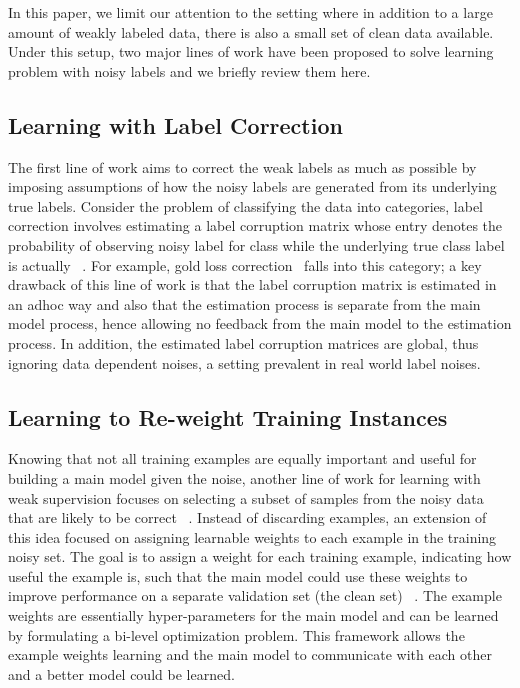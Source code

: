 In this paper, we limit our attention to the setting where in addition
to a large amount of weakly labeled data, there is also a small set of
clean data available.  Under this setup, two major lines of work have
been proposed to solve learning problem with noisy labels and we
briefly review them here.

\subsection{Learning with Label Correction}

The first line of work aims to correct the weak labels as much as
possible by imposing assumptions of how the noisy labels are generated
from its underlying true labels. Consider the problem of classifying
the data into  categories, label correction involves estimating a
label corruption matrix  whose entry  denotes
the probability of observing noisy label for class  while the
underlying true class label is actually
~\cite{han2018masking,yao2020dual,xia2019anchor}. For example, gold
loss correction~\cite{hendrycks2018using} falls into this category; a
key drawback of this line of work is that the label corruption matrix
is estimated in an adhoc way and also that the estimation process is
separate from the main model process, hence allowing no feedback from
the main model to the estimation process. In addition, the estimated
label corruption matrices are global, thus ignoring data dependent
noises, a setting prevalent in real world label
noises\cite{xia2020part}.



\subsection{Learning to Re-weight Training Instances}

Knowing that not all training examples are equally important and
useful for building a main model given the noise, another line of work
for learning with weak supervision focuses on selecting a subset of
samples from the noisy data that are likely to be correct
~\cite{jiang2017mentornet,han2018co,pmlr-v97-yu19b,fang2020rethinking}. Instead of discarding examples,
an extension of this idea focused on assigning learnable weights to
each example in the training noisy set. The goal is to assign a weight
for each training example, indicating how useful the example is, such
that the main model could use these weights to improve performance on
a separate validation set (the clean set) ~\cite{ren2018learning, shu2019meta}. The
example weights are essentially hyper-parameters for the main model
and can be learned by formulating a bi-level optimization
problem. This framework allows the example weights learning and the
main model to communicate with each other and a better model could be
learned.


